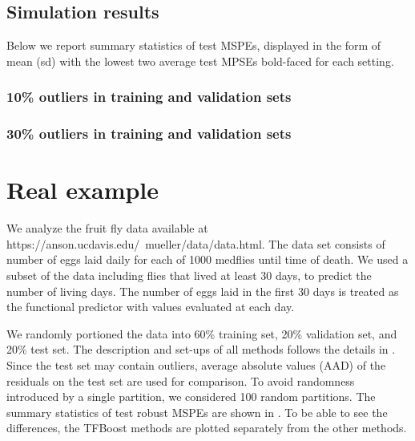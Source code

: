 \documentclass{article}
\begin{document}
\subsection{Simulation results}
Below we report summary statistics of test MSPEs, displayed in the form of mean (sd) with the lowest two average test MPSEs bold-faced for each setting. 
\hspace{-2cm}
\renewcommand{\arraystretch}{1.5}
\addtolength{\tabcolsep}{-3pt} 

\subsubsection*{10\% outliers in training and validation sets}


\subsubsection*{30\% outliers in training and validation sets}


\restoregeometry

\section{Real example} 
We analyze the fruit fly data available at https://anson.ucdavis.edu/~mueller/data/data.html. The data set  consists of number of eggs laid daily for each of 1000 medflies  until time of death. We used a subset of the data including flies that lived at least 30 days, to predict the number of living days. The number of eggs laid in the first 30 days is treated as the functional predictor with values evaluated at each day. 

We randomly portioned the data into 60\% training set, 20\% validation set, and 20\% test set.  The description and set-ups of all methods follows the details in . Since the test set may contain outliers,  average absolute values (AAD) of the residuals on the test set are used for comparison.  To avoid randomness introduced by a single partition, we considered 100 random partitions. The summary statistics of test robust MSPEs are shown in .  To be able to see the differences, the TFBoost methods are plotted separately from the other methods. 
\end{document}
